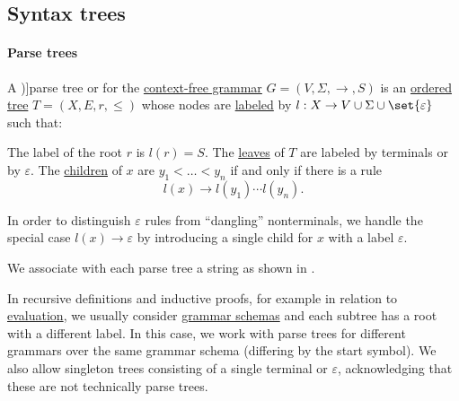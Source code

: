 \subsection{Syntax trees}\label{subsec:syntax_trees}

\paragraph{Parse trees}

\begin{definition}\label{def:parse_tree}
  A \term[ru=дерево вывода (\cite[81]{Гладкий1973Языки})]{parse tree} or  for the \hyperref[def:chomsky_hierarchy/context_free]{context-free grammar} \( G = (V, \Sigma, \to, S) \) is an \hyperref[def:ordered_tree]{ordered tree} \( T = (X, E, r, \leq) \) whose nodes are \hyperref[def:labeled_set]{labeled} by \( l: X \to V \cup \Sigma \cup \set{ \varepsilon } \) such that:
  \begin{thmenum}
     The label of the root \( r \) is \( l(r) = S \).
     The \hyperref[def:rooted_tree/leaf]{leaves} of \( T \) are labeled by terminals or by \( \varepsilon \).
     The \hyperref[def:rooted_tree/parent_child]{children} of \( x \) are \( y_1 < \ldots < y_n \) if and only if there is a rule
    \begin{equation*}
      l(x) \to l(y_1) \cdots l(y_n).
    \end{equation*}

    In order to distinguish \( \varepsilon \) rules from \enquote{dangling} nonterminals, we handle the special case \( l(x) \to \varepsilon \) by introducing a single child for \( x \) with a label \( \varepsilon \).
  \end{thmenum}
\end{definition}
\begin{comments}
  \item We associate with each parse tree a string as shown in .
\end{comments}

\begin{remark}\label{rem:parse_tree_roots}
  In recursive definitions and inductive proofs, for example in relation to \hyperref[con:evaluation]{evaluation}, we usually consider \hyperref[def:formal_grammar/schema]{grammar schemas} and each subtree has a root with a different label. In this case, we work with parse trees for different grammars over the same grammar schema (differing by the start symbol). We also allow singleton trees consisting of a single terminal or \( \varepsilon \), acknowledging that these are not technically parse trees.
\end{remark}

